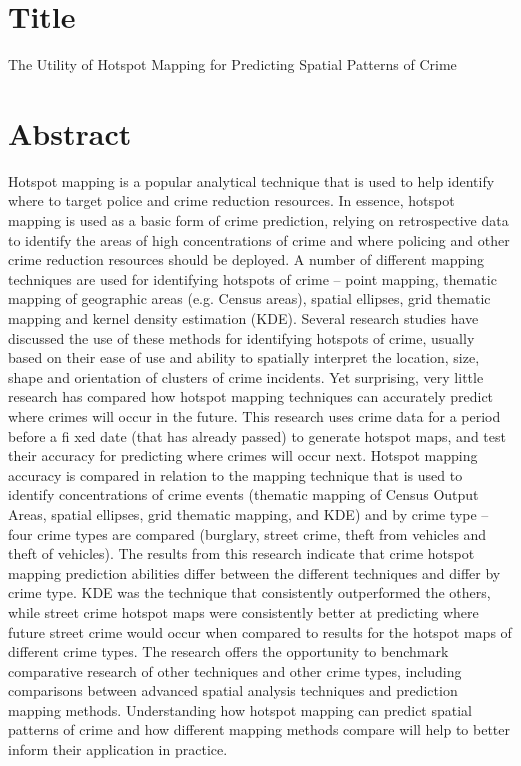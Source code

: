\documentclass[10pt,letterpaper,english]{article}
\begin{document}
\section*{Title}
The Utility of Hotspot Mapping for Predicting Spatial Patterns of Crime

\section*{Abstract}

Hotspot mapping is a popular analytical technique that is used to help identify where to target police and crime reduction resources. In essence, hotspot mapping is used as a basic form of crime prediction, relying on retrospective data to identify the areas of high concentrations of crime and where policing and other crime reduction resources should be deployed. A number of different mapping techniques are used for identifying hotspots of crime – point mapping, thematic mapping of geographic areas (e.g. Census areas), spatial ellipses, grid thematic mapping and kernel density estimation (KDE). Several research studies have discussed the use of these methods for identifying hotspots of crime, usually based on their ease of use and ability to spatially interpret the location, size, shape and orientation of clusters of crime incidents. Yet surprising, very little research has compared how hotspot mapping techniques can accurately predict where crimes will occur in the future. This research uses crime data for a period before a fi xed date (that has already passed) to generate hotspot maps, and test their accuracy for predicting where crimes will occur next. Hotspot mapping accuracy is compared in relation to the mapping technique that is used to identify concentrations of crime events (thematic mapping of Census Output Areas, spatial ellipses, grid thematic mapping, and KDE) and by crime type – four crime types are compared (burglary, street crime, theft from vehicles and theft of vehicles). The results from this research indicate that crime hotspot mapping prediction abilities differ between the different techniques and differ by crime type. KDE was the technique that consistently outperformed the others, while street crime hotspot maps were consistently better at predicting where future street crime would occur when compared to results for the hotspot maps of different crime types. The research offers the opportunity to benchmark comparative research of other techniques and other crime types, including comparisons between advanced spatial analysis techniques and prediction mapping methods. Understanding how hotspot mapping can predict spatial patterns of crime and how different mapping methods compare will help to better inform their application in practice. 
\end{document}
